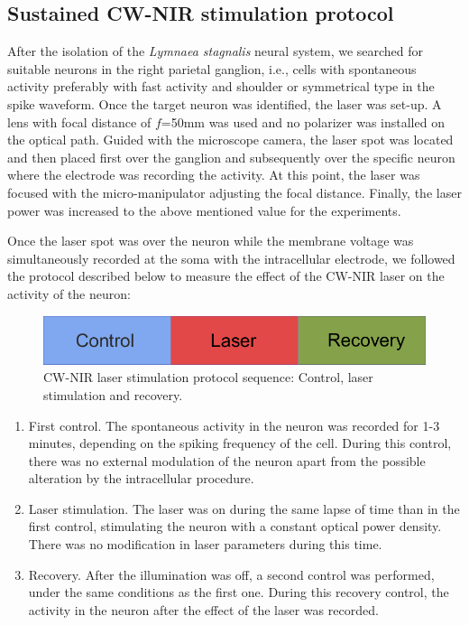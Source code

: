 
\subsection{Sustained CW-NIR stimulation protocol}
\label{sect:sustained-protocol}
After the isolation of the \textit{Lymnaea stagnalis} neural system, we searched for suitable neurons in the right parietal ganglion, i.e., cells with spontaneous activity preferably with fast activity and shoulder or symmetrical type in the spike waveform. 
Once the target neuron was identified, the laser was set-up. A lens with focal distance of $f$=50mm was used and no polarizer was installed on the optical path. Guided with the microscope camera, the laser spot was located and then placed first over the ganglion and subsequently over the specific neuron where the electrode was recording the activity. 
At this point, the laser was focused with the micro-manipulator adjusting the focal distance. Finally, the laser power was increased to the above mentioned value for the experiments.

Once the laser spot was over the neuron while the membrane voltage was simultaneously recorded at the soma with the intracellular electrode, we followed the protocol described below to measure the effect of the CW-NIR laser on the activity of the neuron:

\begin{figure}[htb!]
	\includegraphics[width=\textwidth]{img/laser/trial-protocol.pdf}
	\caption{CW-NIR laser stimulation protocol sequence: Control, laser stimulation and recovery.}
	\label{fig:protocol scheme}
\end{figure}

\begin{enumerate}
	\item First control. The spontaneous activity in the neuron was recorded for 1-3 minutes, depending on the spiking frequency of the cell. During this control, there was no external modulation of the neuron apart from the possible alteration by the intracellular procedure.  
	\item Laser stimulation. The laser was on during the same lapse of time than in the first control, stimulating the neuron with a constant optical power density. There was no modification in laser parameters during this time.
	\item Recovery. After the illumination was off, a second control was performed, under the same conditions as the first one. During this recovery control, the activity in the neuron after the effect of the laser was recorded.
\end{enumerate}



